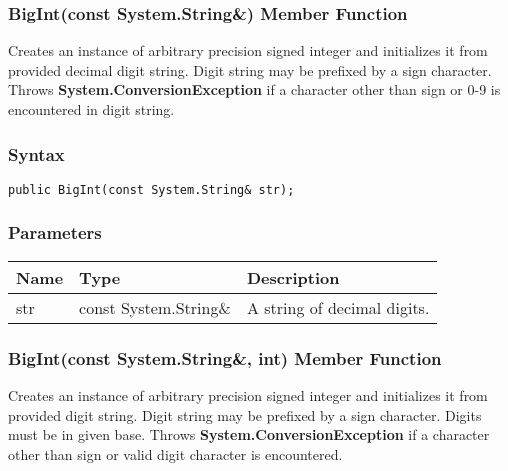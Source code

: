 \documentclass[a4paper,oneside,11.000000pt]{book}
\begin{document}
\hypertarget{System.Numerics.Multiprecision.BigInt.constructor.P.System.Numerics.Multiprecision.BigInt.C.R.System.String}{\subsubsection*{BigInt(const System.String\&) Member Function}}
\begin{flushleft}
Creates an instance of arbitrary precision signed integer and initializes it from provided decimal digit string.
Digit string may be prefixed by a sign character.
Throws \textbf{System.ConversionException} if a character other than sign or 0-9 is encountered in digit string.

\end{flushleft}
\subsubsection*{Syntax}\texttt{public BigInt(const System.String\& str);}

\subsubsection*{Parameters}
\begin{flushleft}
\begin{supertabular}[l]{lll}
\textbf{Name}
& \textbf{Type}
& \textbf{Description}
\\
\hline
str
& const System.\-String\&\-
& A string of decimal digits.

\\
\end{supertabular}

\end{flushleft}
\clearpage

\hypertarget{System.Numerics.Multiprecision.BigInt.constructor.P.System.Numerics.Multiprecision.BigInt.C.R.System.String.int}{\subsubsection*{BigInt(const System.String\&, int) Member Function}}
\begin{flushleft}
Creates an instance of arbitrary precision signed integer and initializes it from provided digit string.
Digit string may be prefixed by a sign character.
Digits must be in given base.
Throws \textbf{System.ConversionException} if a character other than sign or valid digit character is encountered.

\end{flushleft}
\end{document}
